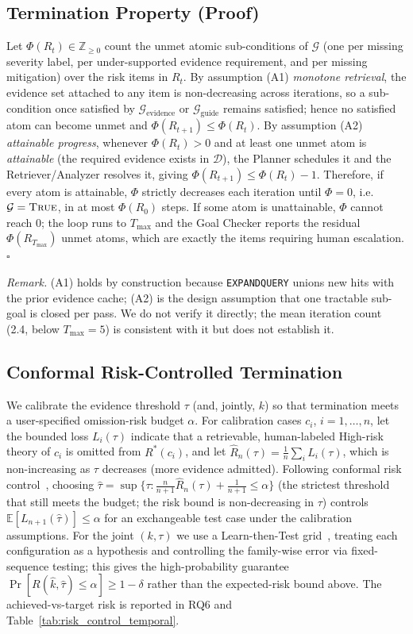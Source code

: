 \subsection{Termination Property (Proof)}
Let $\Phi(R_t)\in\mathbb{Z}_{\geq 0}$ count the unmet atomic sub-conditions of $\mathcal{G}$ (one per missing severity label, per under-supported evidence requirement, and per missing mitigation) over the risk items in $R_t$.
By assumption (A1) \emph{monotone retrieval}, the evidence set attached to any item is non-decreasing across iterations, so a sub-condition once satisfied by $\mathcal{G}_{\text{evidence}}$ or $\mathcal{G}_{\text{guide}}$ remains satisfied; hence no satisfied atom can become unmet and $\Phi(R_{t+1})\leq\Phi(R_t)$.
By assumption (A2) \emph{attainable progress}, whenever $\Phi(R_t)>0$ and at least one unmet atom is \emph{attainable} (the required evidence exists in $\mathcal{D}$), the Planner schedules it and the Retriever/Analyzer resolves it, giving $\Phi(R_{t+1})\leq\Phi(R_t)-1$.
Therefore, if every atom is attainable, $\Phi$ strictly decreases each iteration until $\Phi=0$, i.e.\ $\mathcal{G}=\textsc{True}$, in at most $\Phi(R_0)$ steps. If some atom is unattainable, $\Phi$ cannot reach $0$; the loop runs to $T_{\max}$ and the Goal Checker reports the residual $\Phi(R_{T_{\max}})$ unmet atoms, which are exactly the items requiring human escalation. \hfill$\square$

\noindent\textit{Remark.} (A1) holds by construction because \texttt{EXPANDQUERY} unions new hits with the prior evidence cache; (A2) is the design assumption that one tractable sub-goal is closed per pass. We do not verify it directly; the mean iteration count (2.4, below $T_{\max}{=}5$) is consistent with it but does not establish it.

\subsection{Conformal Risk-Controlled Termination}
We calibrate the evidence threshold $\tau$ (and, jointly, $k$) so that termination meets a user-specified omission-risk budget $\alpha$.
For calibration cases $c_i$, $i=1,\dots,n$, let the bounded loss $L_i(\tau)$ indicate that a retrievable, human-labeled High-risk theory of $c_i$ is omitted from $R^*(c_i)$, and let $\hat R_n(\tau)=\frac1n\sum_i L_i(\tau)$, which is non-increasing as $\tau$ decreases (more evidence admitted).
Following conformal risk control~\citep{angelopoulos2023conformalrisk}, choosing
$\hat\tau=\sup\{\tau:\tfrac{n}{n+1}\hat R_n(\tau)+\tfrac{1}{n+1}\le\alpha\}$ (the strictest threshold that still meets the budget; the risk bound is non-decreasing in $\tau$)
controls $\mathbb{E}[L_{n+1}(\hat\tau)]\le\alpha$ for an exchangeable test case under the calibration assumptions.
For the joint $(k,\tau)$ we use a Learn-then-Test grid~\citep{angelopoulos2021ltt}, treating each configuration as a hypothesis and controlling the family-wise error via fixed-sequence testing; this gives the high-probability guarantee $\Pr[R(\hat k,\hat\tau)\le\alpha]\ge 1-\delta$ rather than the expected-risk bound above.
The achieved-vs-target risk is reported in RQ6 and Table~\ref{tab:risk_control_temporal}.

